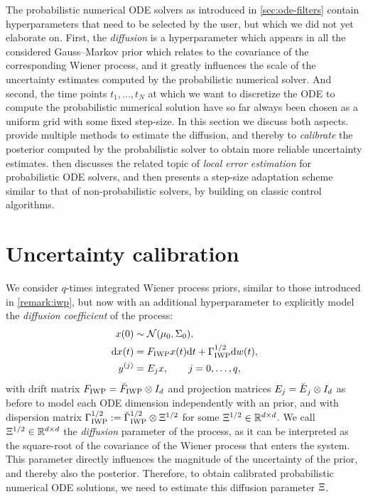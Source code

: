 \documentclass{mimosis}
\begin{document}

The probabilistic numerical ODE solvers as introduced in
\cref{sec:ode-filters}
contain hyperparameters that need to be selected by the user,
but which we did not yet elaborate on.
First, the \emph{diffusion} is a hyperparameter which appears in all the considered Gauss--Markov prior which relates to the covariance of the corresponding Wiener process, and it greatly influences the scale of the uncertainty estimates computed by the probabilistic numerical solver.
And second, the time points \(t_1, \dots, t_N\) at which we want to discretize the ODE to compute the probabilistic numerical solution have so far always been chosen as a uniform grid with some fixed step-size.
In this section we discuss both aspects.
 provide multiple methods to estimate the diffusion, and thereby to \emph{calibrate} the posterior computed by the probabilistic solver to obtain more reliable uncertainty estimates.
 then discusses the related topic of \emph{local error estimation} for probabilistic ODE solvers, and then presents a step-size adaptation scheme similar to that of non-probabilistic solvers, by building on classic control algorithms.
\section{Uncertainty calibration}
\label{sec:orgc86e9f7}
\label{sec:calibration}
\label{sec:calibration:global}
We consider \(q\)-times integrated Wiener process priors, similar to those introduced in \cref{remark:iwp}, but now with an additional hyperparameter to explicitly model the \emph{diffusion coefficient} of the process:
\begin{subequations}
\begin{align}
  \st(0) &\sim \N( \mean{0}, \cov{0} ), \\
  \dd \st(t) &= \drift_\text{IWP} \st(t) \dd t + \disp_\text{IWP} \dd \wiener(t), \\
  \val^{(j)} &= \proj{j} \st, \qquad j = 0, \dots, q,
\end{align}
\end{subequations}
with drift matrix
\(F_\text{IWP} = \breve{F}_\text{IWP} \otimes I_d\)
and projection matrices
\(E_{j} = \breve{E_{}}_j \otimes I_d\)
as before to model each ODE dimension independently with an  prior,
and with dispersion matrix
\(\Gamma^{1/2}_\text{IWP} := \breve{\Gamma}^{1/2}_\text{IWP} \otimes \Xi^{1/2}\)
for some \(\Xi^{1/2} \in \mathbb{R}^{d \times d}\).
We call \(\Xi^{1/2} \in \mathbb{R}^{d \times d}\) the \emph{diffusion} parameter of the process, as it can be interpreted as the square-root of the covariance of the Wiener process that enters the system.
This parameter directly influences the magnitude of the uncertainty of the prior, and thereby also the posterior.
Therefore, to obtain calibrated probabilistic numerical ODE solutions, we need to estimate this diffusion parameter \(\Xi\).
\end{document}
